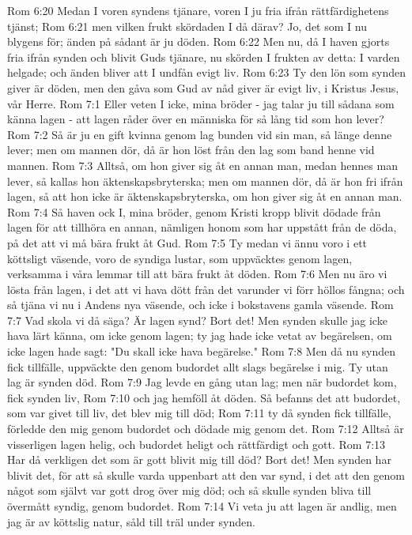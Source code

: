 Rom 6:20  Medan I voren syndens tjänare, voren I ju fria ifrån rättfärdighetens tjänst;
Rom 6:21  men vilken frukt skördaden I då därav? Jo, det som I nu blygens för; änden på sådant är ju döden.
Rom 6:22  Men nu, då I haven gjorts fria ifrån synden och blivit Guds tjänare, nu skörden I frukten av detta: I varden helgade; och änden bliver att I undfån evigt liv.
Rom 6:23  Ty den lön som synden giver är döden, men den gåva som Gud av nåd giver är evigt liv, i Kristus Jesus, vår Herre.
Rom 7:1  Eller veten I icke, mina bröder - jag talar ju till sådana som känna lagen - att lagen råder över en människa för så lång tid som hon lever?
Rom 7:2  Så är ju en gift kvinna genom lag bunden vid sin man, så länge denne lever; men om mannen dör, då är hon löst från den lag som band henne vid mannen.
Rom 7:3  Alltså, om hon giver sig åt en annan man, medan hennes man lever, så kallas hon äktenskapsbryterska; men om mannen dör, då är hon fri ifrån lagen, så att hon icke är äktenskapsbryterska, om hon giver sig åt en annan man.
Rom 7:4  Så haven ock I, mina bröder, genom Kristi kropp blivit dödade från lagen för att tillhöra en annan, nämligen honom som har uppstått från de döda, på det att vi må bära frukt åt Gud.
Rom 7:5  Ty medan vi ännu voro i ett köttsligt väsende, voro de syndiga lustar, som uppväcktes genom lagen, verksamma i våra lemmar till att bära frukt åt döden.
Rom 7:6  Men nu äro vi lösta från lagen, i det att vi hava dött från det varunder vi förr höllos fångna; och så tjäna vi nu i Andens nya väsende, och icke i bokstavens gamla väsende.
Rom 7:7  Vad skola vi då säga? Är lagen synd? Bort det! Men synden skulle jag icke hava lärt känna, om icke genom lagen; ty jag hade icke vetat av begärelsen, om icke lagen hade sagt: "Du skall icke hava begärelse."
Rom 7:8  Men då nu synden fick tillfälle, uppväckte den genom budordet allt slags begärelse i mig. Ty utan lag är synden död.
Rom 7:9  Jag levde en gång utan lag; men när budordet kom, fick synden liv,
Rom 7:10  och jag hemföll åt döden. Så befanns det att budordet, som var givet till liv, det blev mig till död;
Rom 7:11  ty då synden fick tillfälle, förledde den mig genom budordet och dödade mig genom det.
Rom 7:12  Alltså är visserligen lagen helig, och budordet heligt och rättfärdigt och gott.
Rom 7:13  Har då verkligen det som är gott blivit mig till död? Bort det! Men synden har blivit det, för att så skulle varda uppenbart att den var synd, i det att den genom något som självt var gott drog över mig död; och så skulle synden bliva till övermått syndig, genom budordet.
Rom 7:14  Vi veta ju att lagen är andlig, men jag är av köttslig natur, såld till träl under synden.
